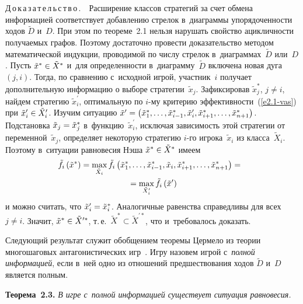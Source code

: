 \begin{multicols}{2}
    \noindent
    Д\,о\,к\,а\,з\,а\,т\,е\,л\,ь\,с\,т\,в\,о\,.\ \ Расширение классов стратегий за счет
обмена информацией соответствует добавлению стрелок в~диаграммы
упорядоченности ходов $\tilde{D}$ и~$D$. При этом по теореме~2.1 нельзя нарушать
свойство ацикличности получаемых графов. Поэтому достаточно провести
доказательство методом математической индукции, проводимой по чис\-лу стрелок в~диаграммах~$\tilde{D}$ или~$D$.
Пусть $\tilde{x}^*\hm\in \tilde{X}^*$ и~для
определенности в~диаграмму~$\tilde{D}$ включена новая дуга $(j,i)$. Тогда, по
сравнению с~исходной игрой, участник~$i$ получает дополнительную информацию
о выборе стратегии~$\tilde{x}_j$. Зафиксировав $\tilde{x}_j^*$, $j\not= i$, \mbox{найдем}
стратегию $\tilde{x}_i^\prime$, оптимальную по \mbox{$i$-му} критерию
эффективности~(\ref{e2.1-vas}) при $\tilde{x}_i^\prime\hm\in \tilde{X}_i^\prime$.
\mbox{Изучим} ситуацию $\tilde{x}^\prime \hm= \left( \tilde{x}_1^*,\ldots, \tilde{x}_{i-1}^*,
\tilde{x}_i^\prime, \tilde{x}^*_{i+1},\ldots, \tilde{x}^*_{n+1}\right)$. Подстановка
$\tilde{x}_j\hm= \tilde{x}^*_j$ в~функцию~$\tilde{x}^\prime_i$, исключая
зависимость этой стратегии от переменной~$\tilde{x}_j$, определяет некоторую
стратегию $i$-го игрока~$\tilde{x}_i$ из класса~$\tilde{X}_i$. Поэтому в~ситуации
равновесия Нэша $\tilde{x}^*\hm\in \tilde{X}^*$ имеем
  \begin{multline*}
   \! \!\!\tilde{f}_i \left( \tilde{x}^*\right) =\max\limits_{\tilde{X}_i} \tilde{f}_i \left(
\tilde{x}^*_1, \ldots, \tilde{x}^*_{i-1},\tilde{x}_i, \tilde{x}^*_{i+1},\ldots,
\tilde{x}^*_{n+1}\right) ={}\hspace*{-0.3pt}\\
{}= \max\limits_{\tilde{X}^\prime_i} \tilde{f}_i\left(
\tilde{x}^\prime\right)
    \end{multline*}
и можно считать, что $\tilde{x}^\prime_i\hm= \tilde{x}^*_i$. Аналогичные равенства
справедливы для всех $j\not=i$. Значит, $\tilde{x}^*\hm\in \tilde{X}^{\prime *}$,
т.\,е.\  $\tilde{X}^*\subset \tilde{X}^{\prime *}$, что и~требовалось доказать.

\smallskip


    Следующий результат служит обобщением теоремы Цермело из теории
многошаговых антагонистических игр~\cite{17-vas}. Игру назовем игрой
с~\textit{полной информацией}, если в~ней одно из отношений предшествования
ходов  $\tilde{D}$ и~$D$ является полным.

    \smallskip

    \noindent
    \textbf{Теорема~2.3.} \textit{В игре с~полной информацией существует
ситуация равновесия.}


\end{multicols}
